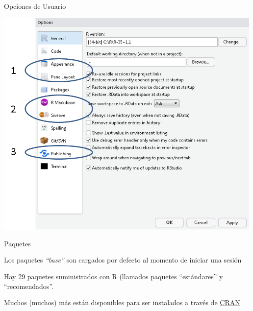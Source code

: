 \documentclass[ignorenonframetext,]{beamer}
\begin{document}
\begin{frame}{Opciones de Usuario}

\begin{center}\includegraphics[width=500px]{./img/img3} \end{center}

\end{frame}

\begin{frame}{Paquetes}

Los paquetes \emph{``base''} son cargados por defecto al momento de
iniciar una sesión

Hay 29 paquetes suministrados con R (llamados paquetes ``estándares'' y
``recomendados''.

Muchos (muchos) más están disponibles para ser instalados a través de
\href{http://CRAN.R-project.org}{CRAN}

\end{frame}
\end{document}
